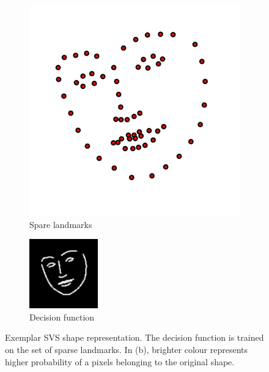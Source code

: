 \begin{figure}[b!]
    \centering
    \begin{subfigure}[b]{0.2\textwidth}
            \includegraphics[width=\textwidth]{resources/landmark}
        \caption{Spare landmarks}
    \end{subfigure}
    \qquad
    \begin{subfigure}[b]{0.2\textwidth}
            \includegraphics[width=\textwidth]{resources/svs}
        \caption{Decision function}
        \label{fig:svs}
    \end{subfigure}
    \caption{Exemplar SVS shape representation. The decision function is trained on the set of sparse landmarks. In (b), brighter colour represents higher probability of a pixels belonging to the original shape.}
    \label{fig:build_svs}
\end{figure}


